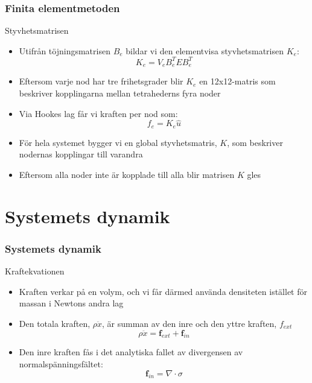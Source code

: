 \documentclass{beamer}
\begin{document}
\begin{frame}
\frametitle{Finita elementmetoden}
\begin{block}{Styvhetsmatrisen}
\begin{itemize}
\item Utifrån töjningsmatrisen $B_e$ bildar vi den elementvisa styvhetsmatrisen $K_e$:
	\begin{equation}\label{eqn:stiffnessmatrix}
    	K_{e} = V_{e} B_ {e}^{T}EB_ {e}^{T}
	\end{equation}
\item Eftersom varje nod har tre frihetsgrader blir $K_e$ en 12x12-matris som beskriver kopplingarna mellan tetrahederns fyra noder
\item Via Hookes lag får vi kraften per nod som:
	\begin{equation}\label{eqn:stiffnessmatrix}
    	f_{e} = K_ {e}\hat{u}
	\end{equation}
\item För hela systemet bygger vi en global styvhetsmatris, $K$, som beskriver nodernas kopplingar till varandra
\item Eftersom alla noder inte är kopplade till alla blir matrisen $K$ gles
\end{itemize}

\end{block}
\end{frame}


\section{Systemets dynamik}
\begin{frame}
\frametitle{Systemets dynamik}
\begin{block}{Kraftekvationen}
\begin{itemize}
\item Kraften verkar på en volym, och vi får därmed använda densiteten istället för massan i Newtons andra lag
\item Den totala kraften, $\rho \ddot{x}$, är summan av den inre och den yttre kraften, $f_{ext}$
	\begin{equation}
		\rho \ddot{x} = \mathbf{f}_{ext} + \mathbf{f}_{in}
	\end{equation}
\item Den inre kraften fås i det analytiska fallet av divergensen av normalspänningsfältet:
	\begin{equation}
		\mathbf{f}_{in} = \nabla \cdot \sigma
	\end{equation}	
		
\end{itemize}	
\end{block}
\end{frame}
\end{document}

